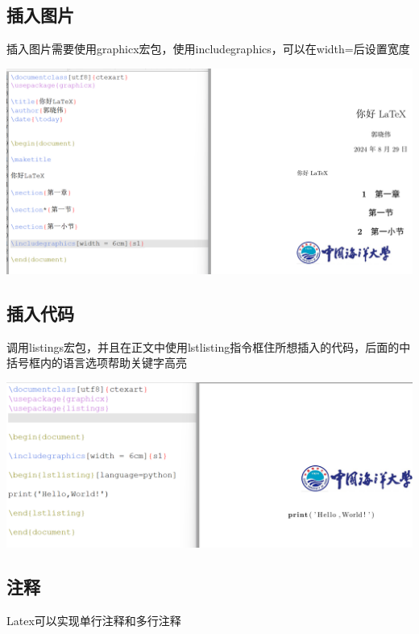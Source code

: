 \documentclass[UTF8,a4paper]{ctexart}
\begin{document}
\begin{sloppypar}
	\subsection{插入图片}
	插入图片需要使用graphicx宏包，使用includegraphics，可以在width=后设置宽度
	
	\includegraphics[width = 16cm]{16}
	
	\subsection{插入代码}
	调用listings宏包，并且在正文中使用lstlisting指令框住所想插入的代码，后面的中括号框内的语言选项帮助关键字高亮
	
	\includegraphics[width = 16cm]{17}
	
	\subsection{注释}
	Latex可以实现单行注释和多行注释
	

\end{sloppypar}
\end{document}
